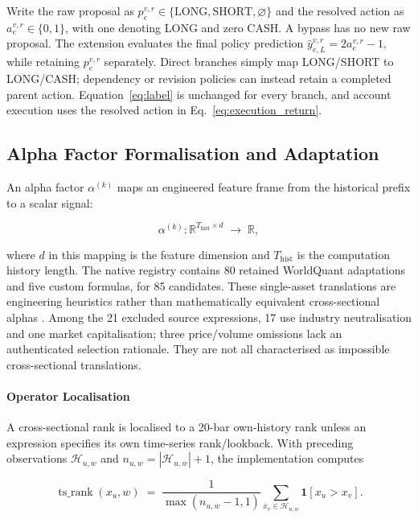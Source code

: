 Write the raw proposal as $p^{v,r}_e\in\{\mathrm{LONG},\mathrm{SHORT},\varnothing\}$ and the resolved action as $a^{v,r}_e\in\{0,1\}$, with one denoting LONG and zero CASH. A bypass has no new raw proposal. The extension evaluates the final policy prediction $\hat y^{v,r}_{e,L}=2a^{v,r}_e-1$, while retaining $p^{v,r}_e$ separately. Direct branches simply map LONG/SHORT to LONG/CASH; dependency or revision policies can instead retain a completed parent action. Equation~\ref{eq:label} is unchanged for every branch, and account execution uses the resolved action in Eq.~\ref{eq:execution_return}.

\subsection{Alpha Factor Formalisation and Adaptation}
An alpha factor $\alpha^{(k)}$ maps an engineered feature frame from the historical prefix to a scalar signal:

\begin{equation}
    \alpha^{(k)} : \mathbb{R}^{T_{\mathrm{hist}} \times d}
    \;\longrightarrow\; \mathbb{R},
\end{equation}


where $d$ in this mapping is the feature dimension and $T_{\mathrm{hist}}$ is the computation history length. The native registry contains 80 retained WorldQuant adaptations and five custom formulas, for 85 candidates. These single-asset translations are engineering heuristics rather than mathematically equivalent cross-sectional alphas \cite{kakushadze2016formulaic}. Among the 21 excluded source expressions, 17 use industry neutralisation and one market capitalisation; three price/volume omissions lack an authenticated selection rationale. They are not all characterised as impossible cross-sectional translations.

\paragraph{Operator Localisation}
A cross-sectional rank is localised to a 20-bar own-history rank unless an expression specifies its own time-series rank/lookback. With preceding observations $\mathcal{H}_{u,w}$ and $n_{u,w}=|\mathcal{H}_{u,w}|+1$, the implementation computes

\begin{equation}
    \operatorname{ts\_rank}(x_u,w)
    \;=\;
    \frac{1}{\max(n_{u,w}-1,1)}
    \sum_{x_v\in\mathcal{H}_{u,w}} \mathbf{1}[x_u>x_v].
    \label{eq:ts_rank_localised}
\end{equation}



